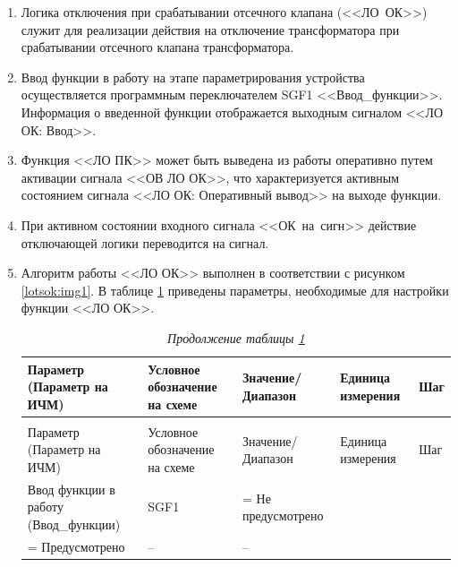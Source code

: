 \documentclass[a4paper, 12pt,table, hidelinks, DIV=calc]{extarticle} %
\begin{document}
\begin{enumerate}[label=\arabic{section}.\arabic{subsection}.\arabic{enumi}, labelsep=4pt, leftmargin=0pt, itemindent=57pt, itemsep=0pt, parsep=5pt]
\begin{enumerate}[label=\arabic{section}.\arabic{subsection}.\arabic{enumi}.\arabic*, labelsep=4pt, leftmargin=0em, itemindent=65pt, parsep=0pt]
\item
Логика отключения при срабатывании отсечного клапана (<<ЛО~ОК>>) служит для реализации действия на отключение трансформатора при срабатывании отсечного клапана трансформатора.
\item
Ввод функции в работу на этапе параметрирования устройства осуществляется программным переключателем SGF1 <<Ввод\_функции>>. Информация о введенной функции отображается выходным сигналом <<ЛО ОК: Ввод>>.
\item
Функция <<ЛО ПК>> может быть выведена из работы оперативно путем активации сигнала <<ОВ ЛО ОК>>, что характеризуется активным состоянием сигнала <<ЛО ОК: Оперативный вывод>> на выходе функции. 
\item
При активном состоянии входного сигнала <<ОК~на~сигн>> действие отключающей логики переводится на сигнал.
\item
Алгоритм работы <<ЛО ОК>> выполнен в соответствии с рисунком \ref{lotsok:img1}. В таблице \ref{lotsok:tbl1} приведены параметры, необходимые для настройки функции <<ЛО ОК>>.

\small
\begin{longtable}{|>{\centering\arraybackslash}m{5.3cm}|>{\centering\arraybackslash}m{3.3cm}|>{\centering\arraybackslash}m{4.2cm}|>{\centering\arraybackslash}m{1.8cm}|>{\centering\arraybackslash}m{1cm}|}
\caption{Параметры для настройки функции <<ЛО ОК>>\hfill\vspace{-0.5\baselineskip}}\label{lotsok:tbl1}\\ 
\hline
\rowcolor{gray!30}
Параметр (Параметр на ИЧМ) & Условное обозначение на схеме & Значение/ Диапазон & Единица измерения & Шаг \\ 
\hline
\endfirsthead
\caption*{\hspace{3pt}\emph{Продолжение таблицы \ref{lotsok:tbl1}\hfill\vspace{-0.5\baselineskip}}} \\ %
\hline
\rowcolor{gray!30}
Параметр (Параметр на ИЧМ) & Условное обозначение на схеме & Значение/ Диапазон & Единица измерения & Шаг \\ 
\endhead
\endfoot
\endlastfoot
\centering Ввод функции в работу (Ввод\_функции) & \centering SGF1 & \centering 0 = Не предусмотрено\\1 = Предусмотрено & \centering -- & \centering \arraybackslash -- \\
\hline
\end{longtable}
\normalsize


\end{enumerate}
\end{enumerate}
\end{document}
